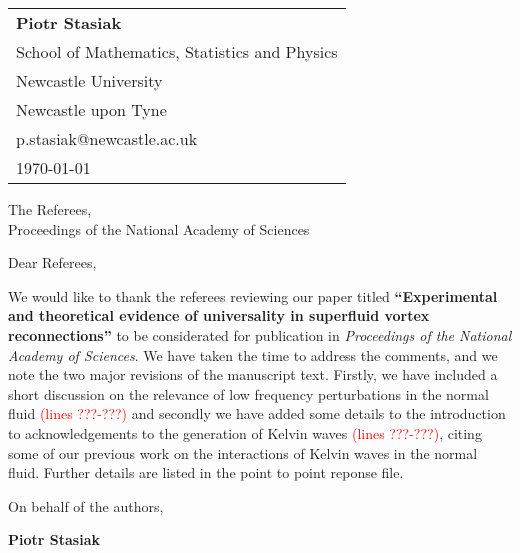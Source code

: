 \documentclass[a4paper,10pt]{letter}
\def\red#1{\textcolor{red}{#1}}
\begin{document}
\begin{flushright}
    \begin{tabular}{l}
        \textbf{Piotr Stasiak} \\
        School of Mathematics, Statistics and Physics\\
        Newcastle University \\
        Newcastle  upon Tyne \\
        p.stasiak@newcastle.ac.uk \\
        \today
    \end{tabular}
\end{flushright}

\vspace{1cm}

The Referees,\\
Proceedings of the National Academy of Sciences\\


\vspace{1cm}

Dear Referees,

\vspace{0.5cm}

We would like to thank the referees reviewing our paper titled
\textbf{``Experimental and theoretical evidence of universality 
in superfluid vortex reconnections''} to be
considerated for publication in \textit{Proceedings of the National Academy of Sciences}. We have taken the time to address the comments, and we note the two major revisions of the manuscript text. Firstly, we have included a short discussion on the relevance of low frequency perturbations in the normal fluid \red{(lines ???-???)} and secondly we have added some details to the introduction to acknowledgements to the generation of Kelvin waves \red{(lines ???-\red???)}, citing some of our previous work on the interactions of Kelvin waves in the normal fluid. Further details are listed in the point to point reponse file.

\vspace{0.5cm}

On behalf of the authors,

\vspace{1cm}

\textbf{Piotr Stasiak}
\end{document}
